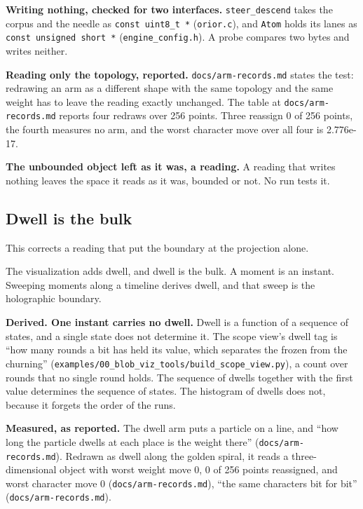 \textbf{Writing nothing, checked for two interfaces.} \texttt{steer\_\allowbreak{}descend} takes the corpus and the needle as \texttt{const uint8\_\allowbreak{}t *} (\texttt{orior.\allowbreak{}c}), and \texttt{Atom} holds its lanes as \texttt{const unsigned short *} (\texttt{engine\_\allowbreak{}config.\allowbreak{}h}). A probe compares two bytes and writes neither.

\textbf{Reading only the topology, reported.} \texttt{docs/\allowbreak{}arm-\allowbreak{}records.\allowbreak{}md} states the test: redrawing an arm as a different shape with the same topology and the same weight has to leave the reading exactly unchanged. The table at \texttt{docs/\allowbreak{}arm-\allowbreak{}records.\allowbreak{}md} reports four redraws over 256 points. Three reassign 0 of 256 points, the fourth measures no arm, and the worst character move over all four is 2.776e-17.

\textbf{The unbounded object left as it was, a reading.} A reading that writes nothing leaves the space it reads as it was, bounded or not. No run tests it.

\subsection{\texorpdfstring{Dwell is the bulk}{Dwell is the bulk}}

This corrects a reading that put the boundary at the projection alone.

The visualization adds dwell, and dwell is the bulk. A moment is an instant. Sweeping moments along a timeline derives dwell, and that sweep is the holographic boundary.

\textbf{Derived. One instant carries no dwell.} Dwell is a function of a sequence of states, and a single state does not determine it. The scope view's dwell tag is “how many rounds a bit has held its value, which separates the frozen from the churning” (\texttt{examples/\allowbreak{}00\_\allowbreak{}blob\_\allowbreak{}viz\_\allowbreak{}tools/\allowbreak{}build\_\allowbreak{}scope\_\allowbreak{}view.\allowbreak{}py}), a count over rounds that no single round holds. The sequence of dwells together with the first value determines the sequence of states. The histogram of dwells does not, because it forgets the order of the runs.

\textbf{Measured, as reported.} The dwell arm puts a particle on a line, and “how long the particle dwells at each place is the weight there” (\texttt{docs/\allowbreak{}arm-\allowbreak{}records.\allowbreak{}md}). Redrawn as dwell along the golden spiral, it reads a three-dimensional object with worst weight move 0, 0 of 256 points reassigned, and worst character move 0 (\texttt{docs/\allowbreak{}arm-\allowbreak{}records.\allowbreak{}md}), “the same characters bit for bit” (\texttt{docs/\allowbreak{}arm-\allowbreak{}records.\allowbreak{}md}).

